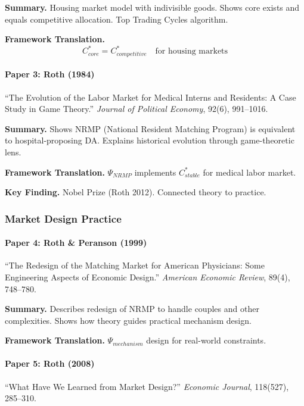 \textbf{Summary.}
Housing market model with indivisible goods. Shows core exists and equals 
competitive allocation. Top Trading Cycles algorithm.

\textbf{Framework Translation.}
\begin{equation}
C^*_{core} = C^*_{competitive} \quad \text{for housing markets}
\end{equation}

\paragraph{Paper 3: Roth (1984)}

``The Evolution of the Labor Market for Medical Interns and Residents: 
A Case Study in Game Theory.''
\textit{Journal of Political Economy}, 92(6), 991--1016.

\textbf{Summary.}
Shows NRMP (National Resident Matching Program) is equivalent to hospital-proposing 
DA. Explains historical evolution through game-theoretic lens.

\textbf{Framework Translation.}
$\Psi_{NRMP}$ implements $C^*_{stable}$ for medical labor market.

\textbf{Key Finding.}
Nobel Prize (Roth 2012). Connected theory to practice.

\subsubsection{Market Design Practice}

\paragraph{Paper 4: Roth \& Peranson (1999)}

``The Redesign of the Matching Market for American Physicians: 
Some Engineering Aspects of Economic Design.''
\textit{American Economic Review}, 89(4), 748--780.

\textbf{Summary.}
Describes redesign of NRMP to handle couples and other complexities.
Shows how theory guides practical mechanism design.

\textbf{Framework Translation.}
$\Psi_{mechanism}$ design for real-world constraints.

\paragraph{Paper 5: Roth (2008)}

``What Have We Learned from Market Design?''
\textit{Economic Journal}, 118(527), 285--310.

